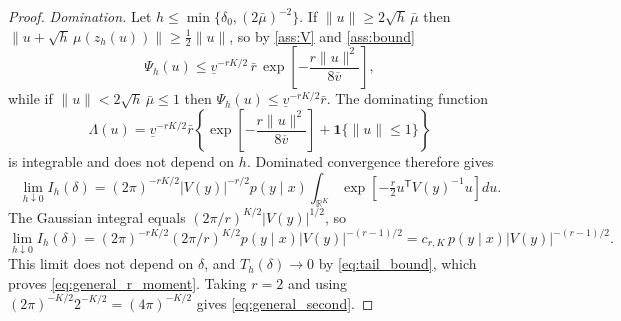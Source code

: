\documentclass[11pt]{article}
\theoremstyle{definition}
\newcommand{\R}{\mathbb{R}}
\begin{document}
\begin{proof}
\emph{Domination.} Let $h\le\min\{\delta_0,(2\bar\mu)^{-2}\}$. If $\lVert u\rVert\ge2\sqrt h\,\bar\mu$ then $\lVert u+\sqrt h\,\mu(z_h(u))\rVert\ge\tfrac12\lVert u\rVert$, so by \ref{ass:V} and \ref{ass:bound}
\[
\Psi_h(u)\le\underline v^{-rK/2}\,\bar r\,\exp\!\left[-\frac{r\lVert u\rVert^2}{8\overline v}\right],
\]
while if $\lVert u\rVert<2\sqrt h\,\bar\mu\le1$ then $\Psi_h(u)\le\underline v^{-rK/2}\bar r$. The dominating function
\[
\Lambda(u)=\underline v^{-rK/2}\bar r\left\{\exp\!\left[-\frac{r\lVert u\rVert^2}{8\overline v}\right]+\mathbf 1\{\lVert u\rVert\le1\}\right\}
\]
is integrable and does not depend on $h$. Dominated convergence therefore gives
\[
\lim_{h\downarrow0}I_h(\delta)
=(2\pi)^{-rK/2}|V(y)|^{-r/2}p(y\mid x)
\int_{\R^K}\exp\!\left[-\tfrac r2u^{\mathsf T}V(y)^{-1}u\right]du .
\]
The Gaussian integral equals $(2\pi/r)^{K/2}|V(y)|^{1/2}$, so
\[
\lim_{h\downarrow0}I_h(\delta)
=(2\pi)^{-rK/2}(2\pi/r)^{K/2}p(y\mid x)|V(y)|^{-(r-1)/2}
=c_{r,K}\,p(y\mid x)|V(y)|^{-(r-1)/2}.
\]
This limit does not depend on $\delta$, and $T_h(\delta)\to0$ by \eqref{eq:tail_bound}, which proves \eqref{eq:general_r_moment}. Taking $r=2$ and using $(2\pi)^{-K/2}2^{-K/2}=(4\pi)^{-K/2}$ gives \eqref{eq:general_second}.
\end{proof}
\end{document}
